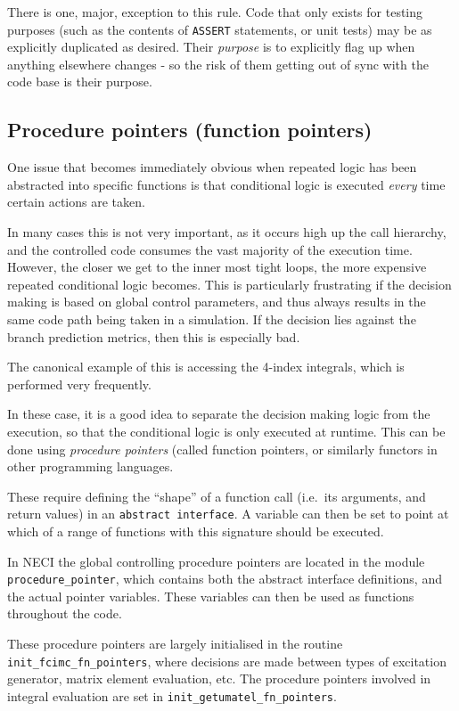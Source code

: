 \documentclass[a4paper,notitlepage]{scrreprt}
\let\code\lstinline
\begin{document}
	There is one, major, exception to this rule. Code that only exists for
	testing purposes (such as the contents of \code{ASSERT} statements,
	or unit tests) may be as explicitly duplicated as
	desired. Their \emph{purpose} is to explicitly flag up when anything
	elsewhere changes - so the risk of them getting out of sync with the code
	base is their purpose.

	\subsection{Procedure pointers (function pointers)}
		One issue that becomes immediately obvious when repeated logic has
		been abstracted into specific functions is that conditional logic is
		executed \emph{every} time certain actions are taken.

		In many cases this is not very important, as it occurs high up the
		call hierarchy, and the controlled code consumes the vast majority of
		the execution time. However, the closer we get to the inner most tight
		loops, the more expensive repeated conditional logic becomes. This
		is particularly frustrating if the decision making is based on global
		control parameters, and thus always results in the same code path being
		taken in a simulation. If the decision lies against the branch
		prediction metrics, then this is especially bad.

		The canonical example of this is accessing the 4-index integrals, which
		is performed very frequently.

		In these case, it is a good idea to separate the decision making logic
		from the execution, so that the conditional logic is only executed at
		runtime. This can be done using \emph{procedure pointers} (called
		function pointers, or similarly functors in other programming
		languages.

		These require defining the ``shape'' of a function call (i.e.\ its
		arguments, and return values) in an \code{abstract interface}. A
		variable can then be set to point at which of a range of functions
		with this signature should be executed.

		In NECI the global controlling procedure pointers are located in
		the module \code{procedure_pointer}, which contains both the abstract
		interface definitions, and the actual pointer variables. These
		variables can then be used as functions throughout the code.

		These procedure pointers are largely initialised in the routine
		\code{init_fcimc_fn_pointers}, where decisions are made between types
		of excitation generator, matrix element evaluation, etc. The procedure
		pointers involved in integral evaluation are set in
		\code{init_getumatel_fn_pointers}.
\end{document}
